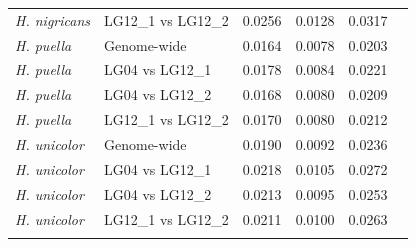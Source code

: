 \begin{xltabular}{\textwidth}{p{5cm}*{2}{l}*{3}{X}}
\textit{H. nigricans} & LG12\_1 vs LG12\_2 & 0.0256 & 0.0128 & 0.0317\\
\addlinespace
\textit{H. puella} & Genome-wide & 0.0164 & 0.0078 & 0.0203\\
\textit{H. puella} & LG04 vs LG12\_1 & 0.0178 & 0.0084 & 0.0221\\
\textit{H. puella} & LG04 vs LG12\_2 & 0.0168 & 0.0080 & 0.0209\\
\textit{H. puella} & LG12\_1 vs LG12\_2 & 0.0170 & 0.0080 & 0.0212\\
\addlinespace
\textit{H. unicolor} & Genome-wide & 0.0190 & 0.0092 & 0.0236\\
\textit{H. unicolor} & LG04 vs LG12\_1 & 0.0218 & 0.0105 & 0.0272\\
\textit{H. unicolor} & LG04 vs LG12\_2 & 0.0213 & 0.0095 & 0.0253\\
\textit{H. unicolor} & LG12\_1 vs LG12\_2 & 0.0211 & 0.0100 & 0.0263\\
\addlinespace
\hline
\end{xltabular}